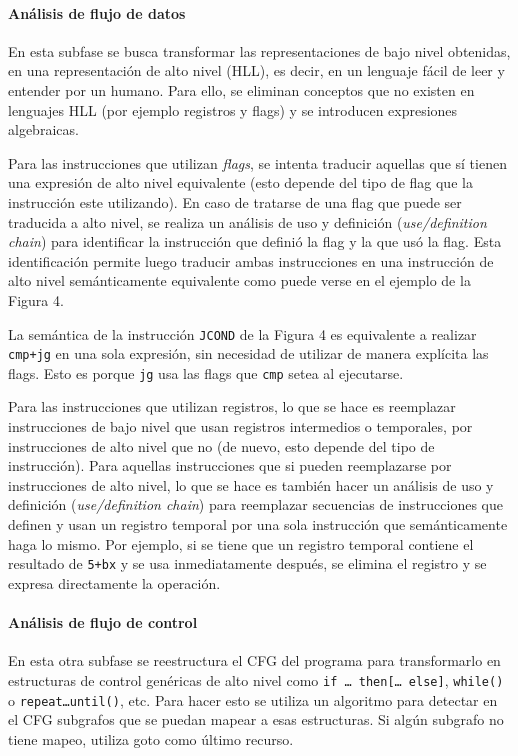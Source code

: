 \documentclass[runningheads]{llncs}
\begin{document}
\paragraph{Análisis de flujo de datos} En esta subfase se busca transformar las representaciones 
de bajo nivel obtenidas, en una representación de alto nivel (HLL), es decir, en un lenguaje 
fácil de leer y entender por un humano. Para ello, se eliminan conceptos que no existen en 
lenguajes HLL (por ejemplo registros y flags) y se introducen expresiones algebraicas.

Para las instrucciones que utilizan \textit{flags}, se intenta traducir aquellas que sí tienen 
una expresión de alto nivel equivalente (esto depende del tipo de flag que la instrucción este utilizando).
En caso de tratarse de una flag que puede ser traducida a alto nivel, se realiza un análisis de uso 
y definición (\textit{use/definition chain}) para identificar la instrucción que definió la flag y 
la que usó la flag. Esta identificación permite luego traducir ambas instrucciones en una instrucción de 
alto nivel semánticamente equivalente como puede verse en el ejemplo de la Figura 4.

La semántica de la instrucción \verb|JCOND| de la Figura 4 es equivalente a realizar 
\verb|cmp+jg| en una sola expresión, sin necesidad de utilizar de manera explícita las flags. 
Esto es porque \verb|jg| usa las flags que \verb|cmp| setea al ejecutarse.

Para las instrucciones que utilizan registros, lo que se hace es reemplazar instrucciones de bajo 
nivel que usan registros intermedios o temporales, por instrucciones de alto nivel que no (de nuevo,
esto depende del tipo de instrucción). Para aquellas instrucciones que si pueden reemplazarse por 
instrucciones de alto nivel, lo que se hace es también hacer un análisis de uso y definición 
(\textit{use/definition chain}) para reemplazar secuencias de instrucciones que definen y usan un 
registro temporal por una sola instrucción que semánticamente haga lo mismo. 
Por ejemplo, si se tiene que un registro temporal contiene el resultado de \verb|5+bx| y se 
usa inmediatamente después, se elimina el registro y se expresa directamente la operación.

\paragraph{Análisis de flujo de control} En esta otra subfase se reestructura el CFG del programa para 
transformarlo en estructuras de control genéricas de alto nivel como \verb|if … then[… else]|, 
\verb|while()| o \verb|repeat…until()|, etc. Para hacer esto se utiliza un algoritmo para detectar 
en el CFG subgrafos que se puedan mapear a esas estructuras. Si algún subgrafo no tiene mapeo, 
utiliza goto como último recurso.
\end{document}
